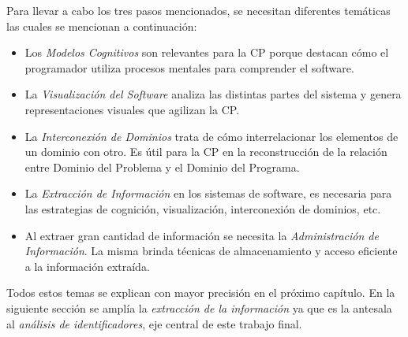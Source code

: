 Para llevar a cabo los tres pasos mencionados, se necesitan diferentes temáticas las cuales se mencionan a continuación:



\begin{itemize}

\item Los \textit{Modelos Cognitivos} son relevantes para la CP porque destacan cómo el programador utiliza procesos mentales para comprender el software.

\item La \textit{Visualización del Software} analiza las distintas partes del sistema y genera representaciones visuales que agilizan la CP.

\item La \textit{Interconexión de Dominios} trata de cómo interrelacionar los elementos de un dominio con otro. Es útil para la CP en la reconstrucción de la relación entre Dominio del Problema y el Dominio del Programa.

\item La \textit{Extracción de Información} en los sistemas de software, es necesaria para las estrategias de cognición, visualización, interconexión de dominios, etc.

\item Al extraer gran cantidad de información se necesita la \textit{Administración de Información}. La misma brinda técnicas de almacenamiento y acceso eficiente a la información extraída.

\end{itemize}

Todos estos temas se explican con mayor precisión en el próximo capítulo. En la siguiente sección se amplía la \textit{extracción de la información} ya que es la antesala al \textit{análisis de identificadores}, eje central de este trabajo final.




